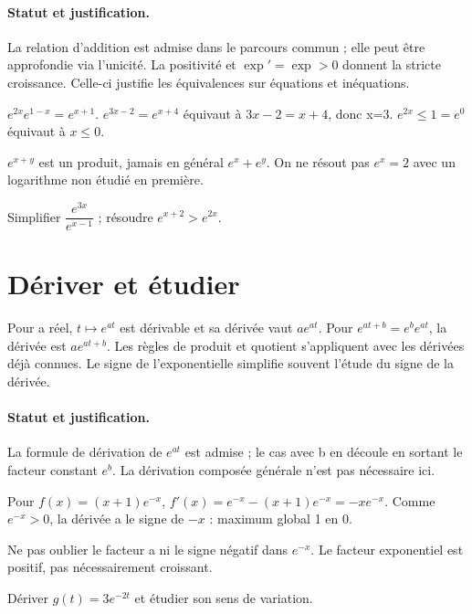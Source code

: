 \paragraph{Statut et justification.} La relation d’addition est admise dans le parcours commun ; elle peut être approfondie via l’unicité. La positivité et $\exp\prime=\exp>0$ donnent la stricte croissance. Celle-ci justifie les équivalences sur équations et inéquations.
\begin{example}$e^{2x}e^{1-x}=e^{x+1}$. $e^{3x-2}=e^{x+4}$ équivaut à $3x-2=x+4$, donc x=3. $e^{2x}\leq1=e^0$ équivaut à $x\leq0$.\end{example}\label{C09-EX2}
\begin{pitfall}$e^{x+y}$ est un produit, jamais en général $e^x+e^y$. On ne résout pas $e^x=2$ avec un logarithme non étudié en première.\end{pitfall}
\begin{application}Simplifier $\dfrac{e^{3x}}{e^{x-1}}$ ; résoudre $e^{x+2}>e^{2x}$.\end{application}\label{C09-AP2}
\section{Dériver et étudier}\label{C09-U3}
\begin{keypoint}
Pour a réel, $t\mapsto e^{at}$ est dérivable et sa dérivée vaut $ae^{at}$. Pour $e^{at+b}=e^be^{at}$, la dérivée est $ae^{at+b}$. Les règles de produit et quotient s’appliquent avec les dérivées déjà connues. Le signe de l’exponentielle simplifie souvent l’étude du signe de la dérivée.
\end{keypoint}
\paragraph{Statut et justification.} La formule de dérivation de $e^{at}$ est admise ; le cas avec b en découle en sortant le facteur constant $e^b$. La dérivation composée générale n’est pas nécessaire ici.
\begin{example}Pour $f(x)=(x+1)e^{-x}$, $f\prime(x)=e^{-x}-(x+1)e^{-x}=-xe^{-x}$. Comme $e^{-x}>0$, la dérivée a le signe de $-x$ : maximum global 1 en 0.\end{example}\label{C09-EX3}
\begin{pitfall}Ne pas oublier le facteur a ni le signe négatif dans $e^{-x}$. Le facteur exponentiel est positif, pas nécessairement croissant.\end{pitfall}
\begin{application}Dériver $g(t)=3e^{-2t}$ et étudier son sens de variation.\end{application}\label{C09-AP3}
